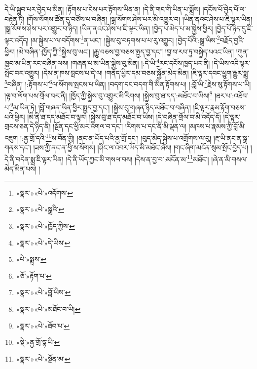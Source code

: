 དེ་ཡི་སྒྲུབ་པར་བྱེད་པ་མིན། །རྟོགས་པ་ངེས་པར་རྟོགས་ཡིན་ན། །དེ་ནི་གང་གི་ཡིན་པ་སྨྲོས། །དངོས་པོ་བྱེད་པོ་ལ་བརྟེན་ཏེ། །གོས་སོགས་ཚོན་དུ་བཙོས་པ་བཞིན། །སྒྲ་སོགས་ཤེས་པར་མི་འགྱུར་བ། །ཡིན་ནའང་ཤེས་པ་ཇི་ལྟར་ཡིན། །སྒྲ་སོགས་ཤེས་པར་འགྱུར་བ་ཉིད། །ཡིན་ནའང་ཤེས་པ་ཇི་ལྟར་ཡིན། །བྱེད་པ་མེད་པ་མ་སྐྱེས་ཕྱིར། །བྱེད་པོ་ཉིད་དུ་ཇི་ལྟར་འདོད། །མ་སྐྱེས་པ་ལ་བདོགས་\footnote{«སྣར་»«པེ་»འདོགས་}ན་ཡང་། །སྐྱེས་བུ་བཏགས་པ་པ་རུ་འགྱུར། །བྱེད་པོའི་:སྒྲ་ཡིས་\footnote{«སྣར་»«པེ་»སྒྲའི་}བརྗོད་བྱའི་ཕྱིར། །མེ་བཞིན་:ཁྱོད་ཀྱི་\footnote{«སྣར་»«པེ་»ཁྱོད་ཀྱིས་}སྐྱེས་བུ་ཡང་། །རྒྱུ་བཅས་བྱ་བཅས་སྤྱད་བྱ་དང་། །བྱ་བ་རབ་ཏུ་བསྐྱེད་པའང་ཡིན། །ཀུན་ཁྱབ་མ་ཡིན་རང་བཞིན་ལས། །གཞན་པ་མ་ཡིན་སྐྱེས་བུ་མིན། །:དེ་ཡི་\footnote{«སྣར་»«པེ་»དེ་ཡིས་}རང་དངོས་ཁྱད་པར་ནི། །དེ་ཡིས་འདི་ལྟར་སྤོང་བར་འགྱུར། །དེས་ན་ཁས་བླངས་པ་དེ་ལ། །གནོད་ཕྱིར་དམ་བཅས་སྐྱོན་མེད་མིན། །ཇི་ལྟར་དབང་ཕྱུག་རྒྱུར་སྨྲ་\footnote{«པེ་»སྨྲས་}བཞིན། །:རྟོགས་པ་\footnote{«ཅོ་»རྟོག་པ་}ལ་སོགས་སྤངས་པ་ཡིན། །བདག་དང་བདག་གི་མིན་རྟོགས་པ། །:བློ་ཡི་\footnote{«སྣར་»«པེ་»བློ་ཡིས་}རྗེས་སུ་རྟོགས་པ་ཡི། །ལྟ་བ་ལོག་པས་གྲོལ་བར་ནི། །ཁྱོད་ཀྱི་སྐྱེས་བུ་འགྱུར་མི་རིགས། །སྐྱེས་བུ་ཐ་དད་:མཐོང་བ་ཡིས།\footnote{«སྣར་»«པེ་»མཐོང་བ་ཡི།} །ཐར་པ་:འཐོབ་པ་\footnote{«སྣར་»«པེ་»ཐོབ་པ་}མ་ཡིན་ཏེ། །བློ་གཞན་ཡིན་ཕྱིར་སྤྱད་བྱ་དང་། །སྐྱེས་བུ་གཞན་ཉིད་མཐོང་བ་བཞིན། །ཇི་ལྟར་རྣམ་རྟོག་བཅས་པའི་ཕྱིར། །མི་ནི་ཐ་དད་མཐོང་བ་ལྟར། །སྐྱེས་བུ་ཐ་དད་མཐོང་བ་ཡིས། །དེ་བཞིན་གྲོལ་བ་མི་འདོད་དོ། །དེ་ལྟར་གྲངས་ཅན་དེ་ཉིད་ནི། །སྔོན་དང་ཕྱི་མར་འགལ་བ་དང་། །རིགས་པ་དང་ནི་མི་ལྡན་ལ། །མཁས་པ་རྣམས་ཀྱི་བློ་མི་འཇུག །:ནྱ་གྲོ་དའི་\footnote{«སྡེ་»ནྱ་གྲོ་དྷ་ཡི་}ས་བོན་གྱི། །ནང་ན་ཡོད་པའི་ནྱ་གྲོ་དང་། །བུད་མེད་སྐྱེས་པ་འགྲོགས་ལ་བུ། །རྔ་ཡི་ནང་ན་སྒྲ་གནས་དང་། །ཟས་ཀྱི་ནང་ན་ཕྱི་ས་སོགས། །ཤིང་ལ་འབར་ཡོད་མི་མཐོང་ཞེས། །གང་ཞིག་མངོན་སུམ་སྤོང་བྱེད་པ། །དེ་ནི་བདེན་སྨྲ་ཇི་ལྟར་ཡིན། །དེ་ནི་ཡོད་ཀྱང་མི་གསལ་བས། །དེས་ན་བྱ་བ་:མངོན་མ་\footnote{«སྣར་»«པེ་»སྔོན་མ་}མཐོང་། །ཞེ་ན་མི་གསལ་མེད་མིན་པས། །
